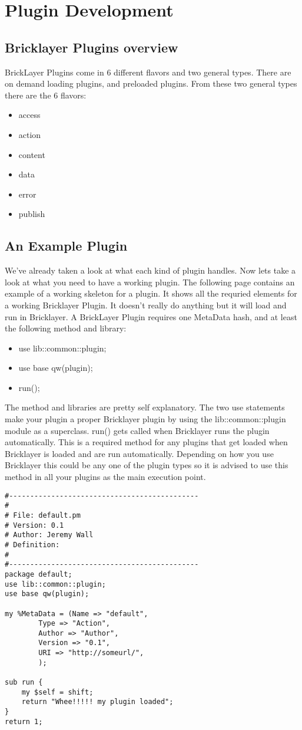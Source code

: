 \chapter{Plugin Development}
\section{Bricklayer Plugins overview}
BrickLayer Plugins come in 6 different flavors and two general types. There are on demand loading plugins, and preloaded plugins. From these two general types there are the 6 flavors:
\begin{itemize}
\item access
\item action
\item content
\item data
\item error
\item publish
\end{itemize}
\section{An Example Plugin}
We've already taken a look at what each kind of plugin handles. Now lets take a look at what you need to have a working plugin. The following page contains an example of a working skeleton for a plugin. It shows all the requried elements for a working Bricklayer Plugin. It doesn't really do anything but it will load and run in Bricklayer. A BrickLayer Plugin requires one MetaData hash, and at least the following method and library:
\begin{itemize}
\item use lib::common::plugin;
\item use base qw(plugin);
\item run();
\end{itemize}
The method and libraries are pretty self explanatory. The two use statements make your plugin a proper Bricklayer plugin by using the lib::common::plugin module as a superclass. run() gets called when Bricklayer runs the plugin automatically. This is a required method for any plugins that get loaded when Bricklayer is loaded and are run automatically. Depending on how you use Bricklayer this could be any one of the plugin types so it is advised to use this method in all your plugins as the main execution point.
\newpage
\begin{verbatim}
#---------------------------------------------
# 
# File: default.pm
# Version: 0.1
# Author: Jeremy Wall
# Definition: 
#
#---------------------------------------------
package default;
use lib::common::plugin;
use base qw(plugin);

my %MetaData = (Name => "default",
		Type => "Action",
		Author => "Author",
		Version => "0.1",
		URI => "http://someurl/",
		);

sub run {
	my $self = shift;	
	return "Whee!!!!! my plugin loaded";
}
return 1;
\end{verbatim}
\newpage
